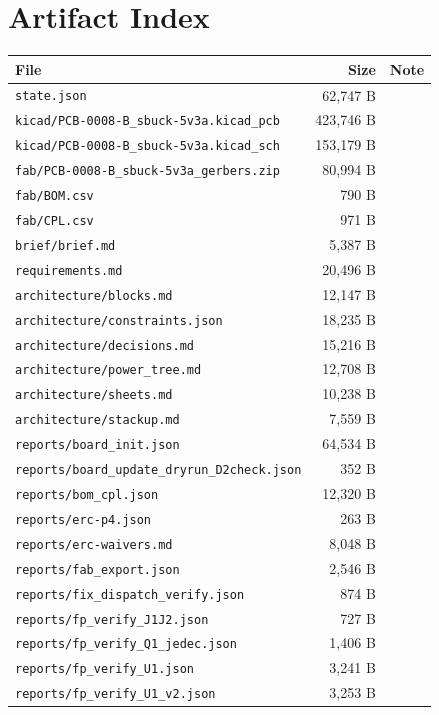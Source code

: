 \documentclass[11pt,a4paper]{article}
\begin{document}
\section{Artifact Index}
{\small
\begin{longtable}{p{9cm}rp{4cm}}
\toprule
\textbf{File} & \textbf{Size} & \textbf{Note} \\
\midrule
\endhead
\texttt{state.json} & 62,747 B &  \\
\texttt{kicad/PCB-0008-B\_sbuck-5v3a.kicad\_pcb} & 423,746 B &  \\
\texttt{kicad/PCB-0008-B\_sbuck-5v3a.kicad\_sch} & 153,179 B &  \\
\texttt{fab/PCB-0008-B\_sbuck-5v3a\_gerbers.zip} & 80,994 B &  \\
\texttt{fab/BOM.csv} & 790 B &  \\
\texttt{fab/CPL.csv} & 971 B &  \\
\texttt{brief/brief.md} & 5,387 B &  \\
\texttt{requirements.md} & 20,496 B &  \\
\texttt{architecture/blocks.md} & 12,147 B &  \\
\texttt{architecture/constraints.json} & 18,235 B &  \\
\texttt{architecture/decisions.md} & 15,216 B &  \\
\texttt{architecture/power\_tree.md} & 12,708 B &  \\
\texttt{architecture/sheets.md} & 10,238 B &  \\
\texttt{architecture/stackup.md} & 7,559 B &  \\
\texttt{reports/board\_init.json} & 64,534 B &  \\
\texttt{reports/board\_update\_dryrun\_D2check.json} & 352 B &  \\
\texttt{reports/bom\_cpl.json} & 12,320 B &  \\
\texttt{reports/erc-p4.json} & 263 B &  \\
\texttt{reports/erc-waivers.md} & 8,048 B &  \\
\texttt{reports/fab\_export.json} & 2,546 B &  \\
\texttt{reports/fix\_dispatch\_verify.json} & 874 B &  \\
\texttt{reports/fp\_verify\_J1J2.json} & 727 B &  \\
\texttt{reports/fp\_verify\_Q1\_jedec.json} & 1,406 B &  \\
\texttt{reports/fp\_verify\_U1.json} & 3,241 B &  \\
\texttt{reports/fp\_verify\_U1\_v2.json} & 3,253 B &  \\

\end{longtable}}
\end{document}
